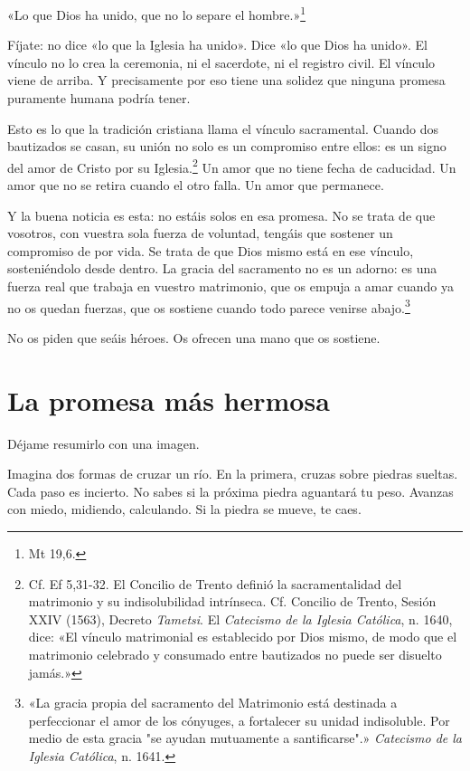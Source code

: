 «Lo que Dios ha unido, que no lo separe el hombre.»\footnote{Mt 19,6.}

Fíjate: no dice «lo que la Iglesia ha unido». Dice «lo que Dios ha unido». El vínculo no lo crea la ceremonia, ni el sacerdote, ni el registro civil. El vínculo viene de arriba. Y precisamente por eso tiene una solidez que ninguna promesa puramente humana podría tener.

Esto es lo que la tradición cristiana llama el vínculo sacramental. Cuando dos bautizados se casan, su unión no solo es un compromiso entre ellos: es un signo del amor de Cristo por su Iglesia.\footnote{Cf. Ef 5,31-32. El Concilio de Trento definió la sacramentalidad del matrimonio y su indisolubilidad intrínseca. Cf. Concilio de Trento, Sesión XXIV (1563), Decreto \textit{Tametsi}. El \textit{Catecismo de la Iglesia Católica}, n. 1640, dice: «El vínculo matrimonial es establecido por Dios mismo, de modo que el matrimonio celebrado y consumado entre bautizados no puede ser disuelto jamás.»} Un amor que no tiene fecha de caducidad. Un amor que no se retira cuando el otro falla. Un amor que permanece.

Y la buena noticia es esta: no estáis solos en esa promesa. No se trata de que vosotros, con vuestra sola fuerza de voluntad, tengáis que sostener un compromiso de por vida. Se trata de que Dios mismo está en ese vínculo, sosteniéndolo desde dentro. La gracia del sacramento no es un adorno: es una fuerza real que trabaja en vuestro matrimonio, que os empuja a amar cuando ya no os quedan fuerzas, que os sostiene cuando todo parece venirse abajo.\footnote{«La gracia propia del sacramento del Matrimonio está destinada a perfeccionar el amor de los cónyuges, a fortalecer su unidad indisoluble. Por medio de esta gracia "se ayudan mutuamente a santificarse".» \textit{Catecismo de la Iglesia Católica}, n. 1641.}

No os piden que seáis héroes. Os ofrecen una mano que os sostiene.

\section{La promesa más hermosa}

Déjame resumirlo con una imagen.

Imagina dos formas de cruzar un río. En la primera, cruzas sobre piedras sueltas. Cada paso es incierto. No sabes si la próxima piedra aguantará tu peso. Avanzas con miedo, midiendo, calculando. Si la piedra se mueve, te caes.

